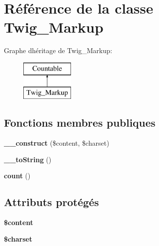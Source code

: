 \hypertarget{class_twig___markup}{}\section{Référence de la classe Twig\+\_\+\+Markup}
\label{class_twig___markup}
Graphe d\textquotesingle{}héritage de Twig\+\_\+\+Markup\+:\begin{figure}[H]
\begin{center}
\leavevmode
\includegraphics[height=2.000000cm]{class_twig___markup}
\end{center}
\end{figure}
\subsection*{Fonctions membres publiques}
\begin{DoxyCompactItemize}
\item 
{\bfseries \+\_\+\+\_\+construct} (\$content, \$charset)\hypertarget{class_twig___markup_ab950404081182ce8442c56bb150116cb}{}\label{class_twig___markup_ab950404081182ce8442c56bb150116cb}

\item 
{\bfseries \+\_\+\+\_\+to\+String} ()\hypertarget{class_twig___markup_a7516ca30af0db3cdbf9a7739b48ce91d}{}\label{class_twig___markup_a7516ca30af0db3cdbf9a7739b48ce91d}

\item 
{\bfseries count} ()\hypertarget{class_twig___markup_ac751e87b3d4c4bf2feb03bee8b092755}{}\label{class_twig___markup_ac751e87b3d4c4bf2feb03bee8b092755}

\end{DoxyCompactItemize}
\subsection*{Attributs protégés}
\begin{DoxyCompactItemize}
\item 
{\bfseries \$content}\hypertarget{class_twig___markup_a57b284fe00866494b33afa80ba729bed}{}\label{class_twig___markup_a57b284fe00866494b33afa80ba729bed}

\item 
{\bfseries \$charset}\hypertarget{class_twig___markup_af10158dd74b75f1d337e83102d6b82ce}{}\label{class_twig___markup_af10158dd74b75f1d337e83102d6b82ce}

\end{DoxyCompactItemize}


